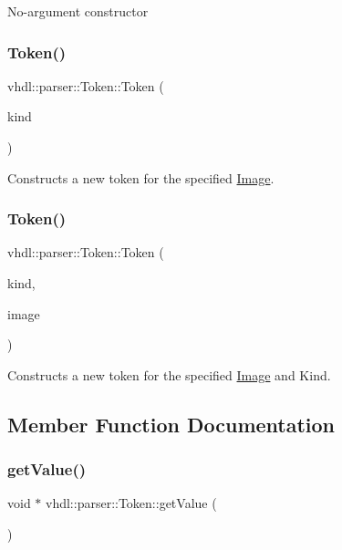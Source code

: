 No-\/argument constructor \mbox{\label{classvhdl_1_1parser_1_1_token_a3111dc253c0e2eb0a0cf128914ec4a44}} 
\subsubsection{\texorpdfstring{Token()}{Token()}\hspace{0.1cm}{\footnotesize\ttfamily [2/3]}}
{\footnotesize\ttfamily vhdl\+::parser\+::\+Token\+::\+Token (\begin{DoxyParamCaption}\item[{int}]{kind }\end{DoxyParamCaption})}

Constructs a new token for the specified \mbox{\hyperlink{class_image}{Image}}. \mbox{\label{classvhdl_1_1parser_1_1_token_a3a25de73b579708d1b82f2ad247816d8}} 
\subsubsection{\texorpdfstring{Token()}{Token()}\hspace{0.1cm}{\footnotesize\ttfamily [3/3]}}
{\footnotesize\ttfamily vhdl\+::parser\+::\+Token\+::\+Token (\begin{DoxyParamCaption}\item[{int}]{kind,  }\item[{J\+A\+V\+A\+C\+C\+\_\+\+S\+T\+R\+I\+N\+G\+\_\+\+T\+Y\+PE}]{image }\end{DoxyParamCaption})}

Constructs a new token for the specified \mbox{\hyperlink{class_image}{Image}} and Kind. 

\subsection{Member Function Documentation}
\mbox{\label{classvhdl_1_1parser_1_1_token_adf2e437f6aeef2e6d195ebfe51ae2bb0}} 
\subsubsection{\texorpdfstring{getValue()}{getValue()}}
{\footnotesize\ttfamily void $\ast$ vhdl\+::parser\+::\+Token\+::get\+Value (\begin{DoxyParamCaption}{ }\end{DoxyParamCaption})}

